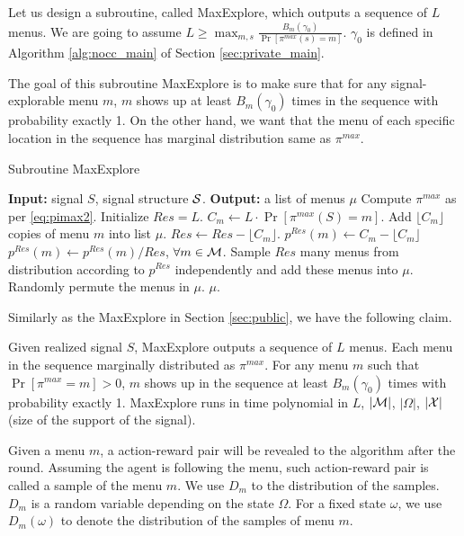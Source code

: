 Let us design a subroutine, called  MaxExplore, which outputs a sequence of $L$ menus. We are going to assume $L \geq \max_{m,s} \frac{B_m(\gamma_0)}{ \Pr[\pi^{max}(s)=m]}$. $\gamma_0$ is defined in Algorithm \ref{alg:nocc_main} of Section \ref{sec:private_main}.

The goal of this subroutine MaxExplore is to make sure that for any signal-explorable menu $m$, $m$ shows up at least $B_m(\gamma_0)$ times in the sequence with probability exactly 1. On the other hand, we want that the menu of each specific location in the sequence has marginal distribution same as $\pi^{max}$.

 \begin{algorithm}[H]
    \caption{Subroutine MaxExplore}
    	\label{alg:nocc_explore}
    \begin{algorithmic}[1]
	\STATE \textbf{Input:} signal $S$, signal structure $\S$.
	\STATE \textbf{Output:} a list of menus $\mu$
	\STATE Compute $\pi^{max}$ as per \eqref{eq:pimax2}.
		\STATE Initialize $Res = L$.
			\STATE $C_m \leftarrow L \cdot \Pr[\pi^{max}(S) = m]$.
                     		\STATE Add $\lfloor C_m\rfloor$ copies of menu $m$ into list $\mu$.
			\STATE $Res \leftarrow Res -\lfloor C_m \rfloor $.
			\STATE $p^{Res}(m)\leftarrow  C_m -  \lfloor C_m\rfloor$
		\ENDFOR 
		\STATE $p^{Res}(m) \leftarrow p^{Res}(m) / Res$, $\forall m \in \M$. 
		\STATE Sample $Res$ many menus from distribution according to $p^{Res}$ independently and add these menus into $\mu$. 
		\STATE Randomly permute the menus in $\mu$.
	\RETURN $\mu$.	 
     \end{algorithmic}
\end{algorithm}

Similarly as the MaxExplore in Section \ref{sec:public}, we have the following claim.
\begin{claim}
\label{clm:maxexplore_nocc}
Given realized signal $S$, MaxExplore outputs a sequence of $L$ menus. Each menu in the sequence marginally distributed as $\pi^{max}$. For any menu $m$ such that $\Pr[\pi^{max} = m] >0$, $m$ shows up in the sequence at least $B_m(\gamma_0)$ times with probability exactly 1. MaxExplore runs in time polynomial in $L$, $|\M|$, $|\varOmega|$, $|\X|$ (size of the support of the signal). 
\end{claim}

Given a menu $m$, a action-reward pair will be revealed to the algorithm after the round. Assuming the agent is following the menu, such action-reward pair is called a sample of the menu $m$. We use $D_m$ to the distribution of the samples. $D_m$ is a random variable depending on the state $\Omega$. For a fixed state $\omega$, we use $D_m(\omega)$ to denote the distribution of the samples of menu $m$. 

